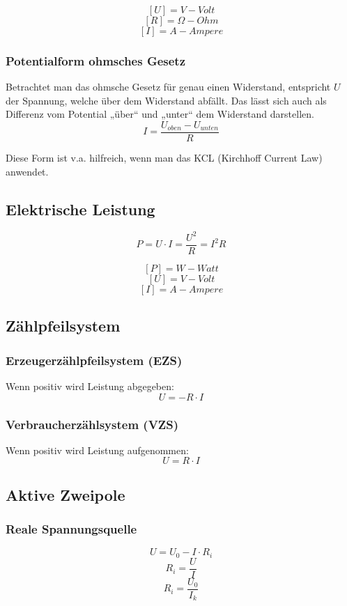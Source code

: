 \documentclass[a4paper,12pt]{article}
\begin{document}
    $$[U]=V - Volt$$
    $$[R]=\Omega - Ohm$$
    $$[I]=A - Ampere$$
    
    \subsubsection{Potentialform ohmsches Gesetz}
    Betrachtet man das ohmsche Gesetz für genau einen Widerstand, entspricht $U$ der Spannung,
    welche über dem Widerstand abfällt. Das lässt sich auch als Differenz vom Potential
    „über“ und „unter“ dem Widerstand darstellen.
    $$I = \frac{U_{oben}-U_{unten}}{R}$$
    
    Diese Form ist v.a. hilfreich, wenn man das KCL (Kirchhoff Current Law) anwendet.
    
    \subsection{Elektrische Leistung}
    $$P=U\cdot I=\frac{U^2}{R}=I^2R$$
    
    $$[P]=W - Watt$$
    $$[U]=V - Volt$$
    $$[I]=A - Ampere$$
    
    \subsection{Zählpfeilsystem}
    
    \subsubsection{Erzeugerzählpfeilsystem (EZS)}
    Wenn positiv wird Leistung abgegeben:
    $$U=-R\cdot I$$
    
    \subsubsection{Verbraucherzählsystem (VZS)}
    Wenn positiv wird Leistung aufgenommen:
    $$U=R\cdot I$$
    
    \subsection{Aktive Zweipole}
    
    \subsubsection{Reale Spannungsquelle}
    $$U=U_0-I\cdot R_i$$
    $$R_i=\frac{U}{I}$$
    $$R_i=\frac{U_0}{I_k}$$
    
\end{document}

